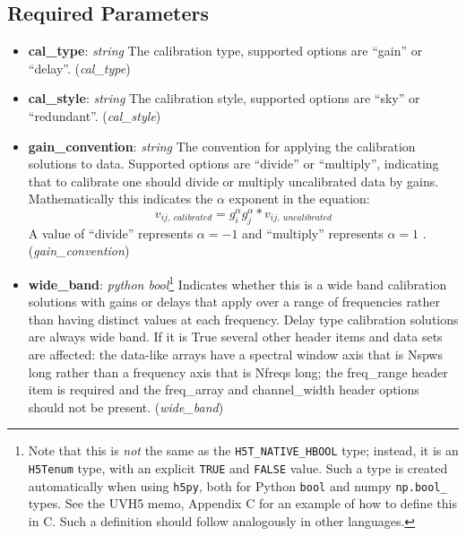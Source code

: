 \documentclass[11pt, oneside]{article}
\begin{document}
\subsection{Required Parameters}
\label{sec:req_params}
\begin{itemize}

\item \textbf{cal\_type}: \textit{string} The calibration type, supported options are
  ``gain'' or ``delay''. (\textit{cal\_type})
\item \textbf{cal\_style}: \textit{string} The calibration style, supported options are
  ``sky'' or ``redundant''. (\textit{cal\_style})
\item \textbf{gain\_convention}: \textit{string} The convention for applying the
  calibration solutions to data. Supported options are  ``divide'' or ``multiply'',
  indicating that to calibrate one should divide or multiply uncalibrated data by
  gains. Mathematically this indicates the $\alpha$ exponent in the equation:
  \begin{equation}
     v_{ij,\ calibrated} =  g_{i}^\alpha g_{j}^\alpha * v_{ij,\ uncalibrated}
  \end{equation}
   A value of ``divide'' represents $\alpha=-1$ and ``multiply'' represents $\alpha=1$ .
  (\textit{gain\_convention})
\item \textbf{wide\_band}: \textit{python bool}\footnote{Note that this is
    \textit{not} the same as the \texttt{H5T\_NATIVE\_HBOOL} type; instead, it
    is an \texttt{H5Tenum} type, with an explicit \texttt{TRUE} and
    \texttt{FALSE} value. Such a type is created automatically when using
    \texttt{h5py}, both for Python \texttt{bool} and numpy \texttt{np.bool\_}
    types. See the UVH5 memo, Appendix C for an example of how to define
    this in C. Such a definition should follow analogously in other languages.}
  Indicates whether this is a wide band calibration solutions with gains or delays
  that apply over a range of frequencies rather than having distinct values at each
  frequency. Delay type calibration solutions are always wide band. If it is True
  several other header items and data sets are affected: the data-like arrays have
  a spectral window axis that is Nspws long rather than a frequency axis that is
  Nfreqs long; the  freq\_range header item is required and the freq\_array and
  channel\_width header options should not be present. (\textit{wide\_band})


\end{itemize}
\end{document}
